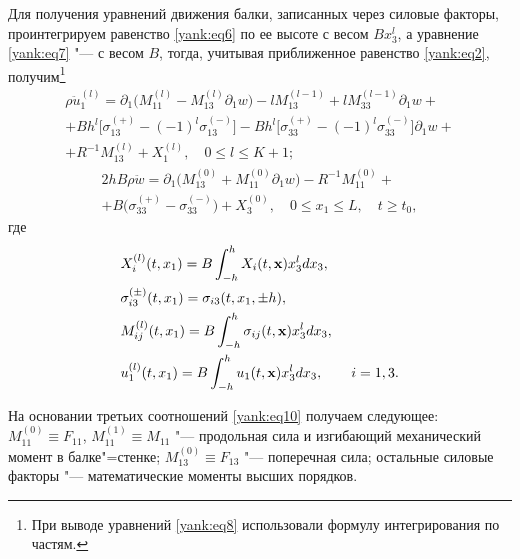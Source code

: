 Для получения уравнений движения балки, записанных через силовые факторы,
проинтегрируем равенство \eqref{yank:eq6} по ее высоте с весом $Bx_3^l$, а уравнение \eqref{yank:eq7}
 "---  с весом $B$, тогда, учитывая приближенное равенство \eqref{yank:eq2}, получим\footnote{При выводе уравнений \eqref{yank:eq8} использовали формулу интегрирования по частям.}
\begin{multline}
\label{yank:eq8}
\rho \ddot {u}_1^{(l)} =\partial _1 \bigl(M_{11}^{(l)} -M_{13}^{(l)}
\partial _1 w \bigr)-lM_{13}^{(l-1)} +lM_{33}^{(l-1)} \partial_1
w+\\
+Bh^l \bigl[\sigma _{13}^{(+)} -( -1 )^l\sigma _{13}^{(-)} \bigr]
-Bh^l \bigl[\sigma _{33}^{(+)} -(-1)^l\sigma _{33}^{(-)} \bigr]\partial _1 w +
\\ +R^{-1}  M_{13}^{(l)} +X_1^{(l)},\quad 0\le l\le K+1;
\end{multline}
\begin{multline}
\label{yank:eq9}
2hB\rho \ddot {w}=\partial _1 \bigl( M_{13}^{(0)} +M_{11}^{(0)} \partial
_1 w \bigr)-R^{-1}M_{11}^{(0)} +\\
+B \bigl(\sigma _{33}^{(+)} -\sigma _{33}^{(-)}  \bigr)+X_3^{(0)}, \quad  0\le x_1 \le L,\quad t\ge t_0,
\end{multline}
где
\begin{equation}
\label{yank:eq10}
\begin{aligned}
& X_i^{(l)} (t,x_1)=B\int _{-h}^h X_i ( t,{\rm {\bf x}} )x_3^l dx_3,\\
&  \sigma
_{i3}^{(\pm )} ( t,x_1 )=\sigma _{i3} (t,x_1,\pm h ), \\
& M_{ij}^{(l)} (t,x_1 )=B\int _{-h}^h \sigma _{ij} (t,{\bf x})x_3^l dx_3,\\
&  u_1^{(l)} (t,x_1)=B\int _{-h}^h u_1 (t,{\bf x} )x_3^l dx_3, \qquad  i=1,  3. 
\end{aligned}
\end{equation}

\smallskip
\hypertarget{yan:rem:1}{}

\begin{remark}[1] На основании третьих соотношений \eqref{yank:eq10} получаем следующее:
${M_{11}^{(0)} \equiv F_{11}}$, $M_{11}^{(1)} \equiv M_{11}$  "---  продольная
сила и изгибающий механический момент в балке"=стенке; $M_{13}^{(0)} \equiv
F_{13} $  "---  поперечная сила; остальные силовые факторы  "---  математические
моменты высших порядков.
\end{remark}


\smallskip

